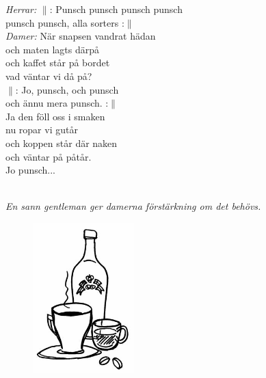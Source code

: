 \documentclass[a6paper, 10pt, twoside]{article}
\begin{document}
\noindent
\begin{center}
\end{center}
\begin{lyrics}
\textit{Herrar:}\physicalonly{\vspace{4pt}\\}
$\|$: Punsch punsch punsch punsch\\
punsch punsch, alla sorters :$\|$
\vspace{5pt}\\
\textit{Damer:}\physicalonly{\vspace{4pt}\\}
När snapsen vandrat hädan\\
och maten lagts därpå\\
och kaffet står på bordet\\
vad väntar vi då på?
\vspace{5pt}\\
$\|$: Jo, punsch, och punsch\\
och ännu mera punsch. :$\|$
\vspace{5pt}\\
Ja den föll oss i smaken \\
nu ropar vi gutår\\
och koppen står där naken\\
och väntar på påtår.
\vspace{5pt}\\
Jo punsch...
\end{lyrics}
\vspace{10pt}\\
\textit{En sann gentleman ger damerna förstärkning om det behövs.}
\begin{figure}[!h]
\centering
\includegraphics[width=0.35\textwidth]{kaffe.jpg}
\end{figure}
\end{document}
